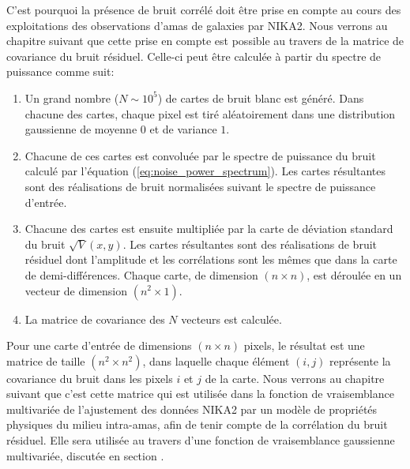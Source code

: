 C'est pourquoi la présence de bruit corrélé doit être prise en compte au cours des exploitations des observations d'amas de galaxies par NIKA2.
Nous verrons au chapitre suivant que cette prise en compte est possible au travers de la matrice de covariance du bruit résiduel.
Celle-ci peut être calculée à partir du spectre de puissance comme suit:
\begin{enumerate}[leftmargin=*]
    \item Un grand nombre ($N \sim 10^5$) de cartes de bruit blanc est généré.
        Dans chacune des cartes, chaque pixel est tiré aléatoirement dans une distribution gaussienne de moyenne $0$ et de variance $1$.
    \item Chacune de ces cartes est convoluée par le spectre de puissance du bruit calculé par l'équation (\ref{eq:noise_power_spectrum}).
        Les cartes résultantes sont des réalisations de bruit normalisées suivant le spectre de puissance d'entrée.
    \item Chacune des cartes est ensuite multipliée par la carte de déviation standard du bruit $\sqrt{V}(x, y)$.
        Les cartes résultantes sont des réalisations de bruit résiduel dont l'amplitude et les corrélations sont les mêmes que dans la carte de demi-différences.
        Chaque carte, de dimension $(n \times n)$, est déroulée en un vecteur de dimension $(n^2 \times 1)$.
    \item La matrice de covariance des $N$ vecteurs est calculée.
\end{enumerate}
Pour une carte d'entrée de dimensions $(n \times n)$ pixels, le résultat est une matrice de taille $(n^2 \times n^2)$, dans laquelle chaque élément $(i, j)$ représente la covariance du bruit dans les pixels $i$ et $j$ de la carte.
Nous verrons au chapitre suivant que c'est cette matrice qui est utilisée dans la fonction de vraisemblance multivariée de l'ajustement des données NIKA2 par un modèle de propriétés physiques du milieu intra-amas, afin de tenir compte de la corrélation du bruit résiduel.
Elle sera utilisée au travers d'une fonction de vraisemblance gaussienne multivariée, discutée en section .

